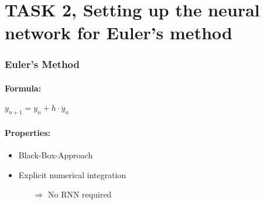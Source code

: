 \section{TASK 2, Setting up the neural network for Euler's method}

\begin{frame}
	\frametitle{Euler's Method}
	\paragraph{Formula:}\vspace{-1mm}
	\quad\quad $y_{n+1} = y_n + h \cdot \dot{y}_n$
	\vspace{5mm}
	
	\paragraph{Properties:}\vspace{-2mm}
	\begin{itemize}
		\item Black-Box-Approach
		\item Explicit numerical integration
		\begin{itemize}
			\item[$\Rightarrow$] No RNN required
		\end{itemize}
	\end{itemize}
\end{frame}

